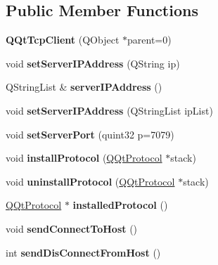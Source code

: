 \subsection*{Public Member Functions}
\begin{DoxyCompactItemize}
\item 
\mbox{\label{class_q_qt_tcp_client_a4e87cbb9d06298aa527afa01ccf66788}} 
{\bfseries Q\+Qt\+Tcp\+Client} (Q\+Object $\ast$parent=0)
\item 
\mbox{\label{class_q_qt_tcp_client_a87a7e4344cdcdd5a257b0ca3ceaa917d}} 
void {\bfseries set\+Server\+I\+P\+Address} (Q\+String ip)
\item 
\mbox{\label{class_q_qt_tcp_client_a625d01959c81d668e4ef45f2981eae50}} 
Q\+String\+List \& {\bfseries server\+I\+P\+Address} ()
\item 
\mbox{\label{class_q_qt_tcp_client_afd51e9aec0535782366f5e046f1a2d2a}} 
void {\bfseries set\+Server\+I\+P\+Address} (Q\+String\+List ip\+List)
\item 
\mbox{\label{class_q_qt_tcp_client_adb84a6d942deff4950f7cdabdc633122}} 
void {\bfseries set\+Server\+Port} (quint32 p=7079)
\item 
\mbox{\label{class_q_qt_tcp_client_a56137590b0020913ea2a1207c44f0ecc}} 
void {\bfseries install\+Protocol} (\mbox{\hyperlink{class_q_qt_protocol}{Q\+Qt\+Protocol}} $\ast$stack)
\item 
\mbox{\label{class_q_qt_tcp_client_a83ddec18ce7857e5103b0db95e565f10}} 
void {\bfseries uninstall\+Protocol} (\mbox{\hyperlink{class_q_qt_protocol}{Q\+Qt\+Protocol}} $\ast$stack)
\item 
\mbox{\label{class_q_qt_tcp_client_ab7cfd60e56c4bcbaf66fca6efa54f1f7}} 
\mbox{\hyperlink{class_q_qt_protocol}{Q\+Qt\+Protocol}} $\ast$ {\bfseries installed\+Protocol} ()
\item 
\mbox{\label{class_q_qt_tcp_client_ae6ef144677529f48f466c89f3245059f}} 
void {\bfseries send\+Connect\+To\+Host} ()
\item 
\mbox{\label{class_q_qt_tcp_client_a397e465de73caec67c6348db93e45cca}} 
int {\bfseries send\+Dis\+Connect\+From\+Host} ()
\end{DoxyCompactItemize}

